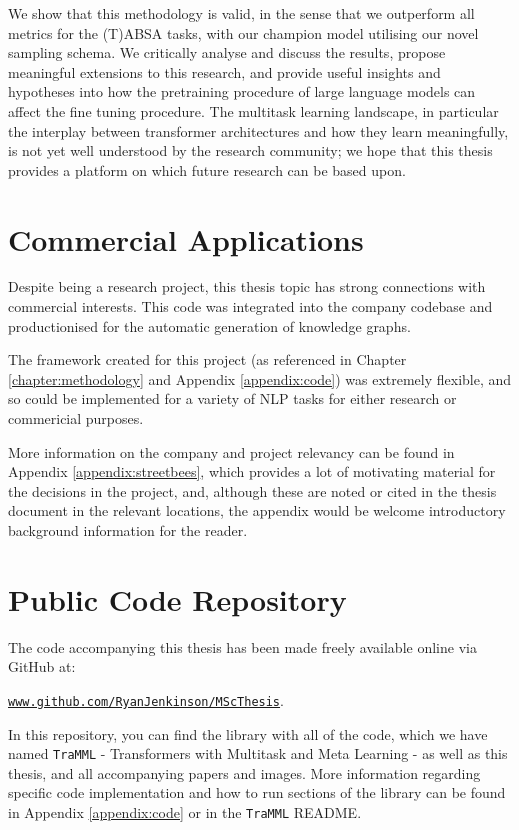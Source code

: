 We show that this methodology is valid, in the sense that we outperform all metrics for the (T)ABSA tasks, with our champion model utilising our novel sampling schema. We critically analyse and discuss the results, propose meaningful extensions to this research, and provide useful insights and hypotheses into how the pretraining procedure of large language models can affect the fine tuning procedure. The multitask learning landscape, in particular the interplay between transformer architectures and how they learn meaningfully, is not yet well understood by the research community; we hope that this thesis provides a platform on which future research can be based upon.

\section{Commercial Applications}
Despite being a research project, this thesis topic has strong connections with commercial interests. This code was integrated into the company codebase and productionised for the automatic generation of knowledge graphs.

The framework created for this project (as referenced in Chapter \ref{chapter:methodology} and Appendix \ref{appendix:code}) was extremely flexible, and so could be implemented for a variety of NLP tasks for either research or commericial purposes.

More information on the company and project relevancy can be found in Appendix \ref{appendix:streetbees}, which provides a lot of motivating material for the decisions in the project, and, although these are noted or cited in the thesis document in the relevant locations, the appendix would be welcome introductory background information for the reader.

\section{Public Code Repository}
\label{section:intro:code}
The code accompanying this thesis has been made freely available online via GitHub at:
 \begin{center}
 \href{www.github.com/RyanJenkinson/MScThesis}{\texttt{www.github.com/RyanJenkinson/MScThesis}}.
 \end{center}
In this repository, you can find the library with all of the code, which we have named \texttt{TraMML} - Transformers with Multitask and Meta Learning - as well as this thesis, and all accompanying papers and images. More information regarding specific code implementation and how to run sections of the library can be found in Appendix \ref{appendix:code} or in the \texttt{TraMML} README.


